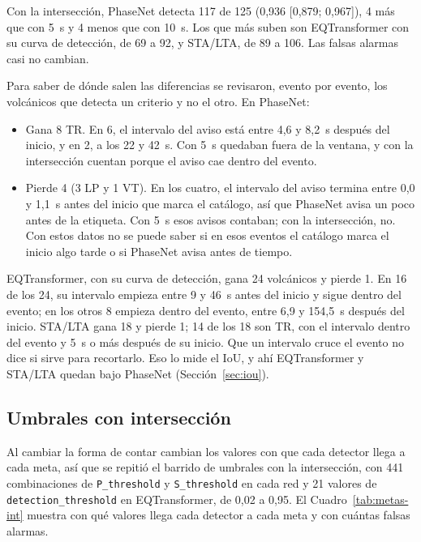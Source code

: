 \documentclass[11pt,a4paper,oneside,spanish,oldfontcommands]{memoir}
\begin{document}
Con la intersección, PhaseNet detecta 117 de 125 (0,936 [0,879; 0,967]), 4 más que con 5~s y 4 menos que con 10~s. Los que más suben son EQTransformer con
su curva de detección, de 69 a 92, y STA/LTA, de 89 a 106. Las falsas alarmas
casi no cambian.

Para saber de dónde salen las diferencias se revisaron, evento por evento, los
volcánicos que detecta un criterio y no el otro. En PhaseNet:

\begin{itemize}
\item Gana 8 TR. En 6, el intervalo del aviso está entre 4,6 y 8,2~s después
  del inicio, y en 2, a los 22 y 42~s. Con 5~s quedaban fuera de la ventana, y
  con la intersección cuentan porque el aviso cae dentro del evento.
\item Pierde 4 (3 LP y 1 VT). En los cuatro, el intervalo del aviso termina
  entre 0,0 y 1,1~s antes del inicio que marca el catálogo, así que PhaseNet avisa un poco antes de la etiqueta. Con 5~s esos avisos contaban; con la intersección,
  no. Con estos datos no se puede saber si en esos eventos el catálogo marca el
  inicio algo tarde o si PhaseNet avisa antes de tiempo.
\end{itemize}

EQTransformer, con su curva de detección, gana 24 volcánicos y pierde 1. En 16
de los 24, su intervalo empieza entre 9 y 46~s antes del inicio y sigue dentro
del evento; en los otros 8 empieza dentro del evento, entre 6,9 y 154,5~s
después del inicio. STA/LTA gana 18 y pierde 1; 14 de los 18 son TR, con el
intervalo dentro del evento y 5~s o más después de su inicio. Que un intervalo cruce
el evento no dice si sirve para recortarlo. Eso lo mide el IoU, y ahí
EQTransformer y STA/LTA quedan bajo PhaseNet (Sección~\ref{sec:iou}).

\subsection*{Umbrales con intersección}

Al cambiar la forma de contar cambian los valores con que cada detector llega a
cada meta, así que se repitió el barrido de umbrales con la intersección, con
441 combinaciones de
\texttt{P\_threshold} y \texttt{S\_threshold} en cada red y 21 valores de
\texttt{detection\_threshold} en EQTransformer, de 0,02 a 0,95. El
Cuadro~\ref{tab:metas-int} muestra con qué valores llega cada detector a cada
meta y con cuántas falsas alarmas.
\end{document}
